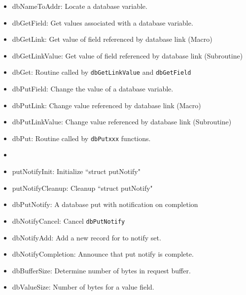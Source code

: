 \begin{itemize}\item dbNameToAddr: Locate a database variable.



\item dbGetField: Get values associated with a database variable.

\item dbGetLink: Get value of field referenced by database link (Macro)

\item dbGetLinkValue: Get value of field referenced by database link (Subroutine)

\item dbGet: Routine called by \verb|dbGetLinkValue| and \verb|dbGetField|



\item dbPutField: Change the value of a database variable.

\item dbPutLink: Change value referenced by database link (Macro)

\item dbPutLinkValue: Change value referenced by database link (Subroutine)

\item dbPut: Routine called by \verb|dbPutxxx| functions.

\item 

\item putNotifyInit: Initialize ``struct putNotify"

\item putNotifyCleanup: Cleanup ``struct putNotify"

\item dbPutNotify: A database put with notification on completion

\item dbNotifyCancel: Cancel \verb|dbPutNotify|

\item dbNotifyAdd: Add a new record for to notify set.

\item dbNotifyCompletion: Announce that put notify is complete.



\item dbBufferSize: Determine number of bytes in request buffer.

\item dbValueSize: Number of bytes for a value field.


\end{itemize}
